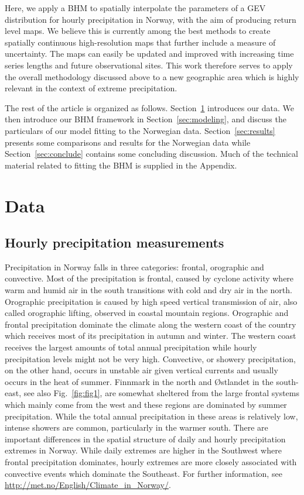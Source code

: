 \documentclass[11pt,english]{article}
\begin{document}
Here, we apply a BHM to spatially interpolate the parameters of a GEV distribution for hourly precipitation in Norway, with the aim of producing return level maps. We believe this is currently among the best methods to create spatially continuous high-resolution maps that further include a measure of uncertainty. The maps can easily be updated and improved with increasing time series lengths and future observational sites. This work therefore serves to apply the overall methodology discussed above to a new geographic area which is highly relevant in the context of extreme precipitation.

The rest of the article is organized as follows. Section~\ref{sec:data} introduces our data. We then introduce our BHM framework in Section~\ref{sec:modeling}, and discuss the particulars of our model fitting to the Norwegian data. Section~\ref{sec:results} presents some comparisons and results for the Norwegian data while Section~\ref{sec:conclude} contains some concluding discussion.  Much of the technical material related to fitting the BHM is supplied in the Appendix.

\section{Data}\label{sec:data}

\subsection{Hourly precipitation measurements}

Precipitation in Norway falls in three categories: frontal, orographic and convective. Most of the precipitation is frontal, caused by cyclone activity where warm and humid air in the south transitions with cold and dry air in the north. Orographic precipitation is caused by high speed vertical transmission of air, also called orographic lifting, observed in coastal mountain regions. Orographic and frontal precipitation dominate the climate along the western coast of the country which receives most of its precipitation in autumn and winter. The western coast receives the largest amounts of total annual precipitation while hourly precipitation levels might not be very high. Convective, or showery precipitation, on the other hand, occurs in unstable air given vertical currents and usually occurs in the heat of summer.  Finnmark in the north and {\O}stlandet in the south-east, see also Fig.~\ref{fig:fig1}, are somewhat sheltered from the large frontal systems which mainly come from the west and these regions are dominated by summer precipitation. While the total annual precipitation in these areas is relatively low, intense showers are common, particularly in the warmer south. There are important differences in the spatial structure of daily and hourly precipitation extremes in Norway. While daily extremes are higher in the Southwest where frontal precipitation dominates, hourly extremes are more closely associated with convective events which dominate the Southeast. For further information, see \url{http://met.no/English/Climate_in_Norway/}. 
\end{document}
